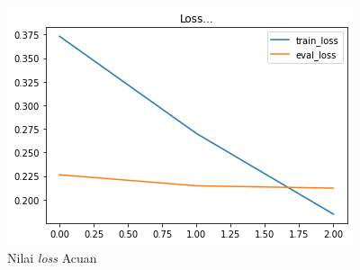 \begin{figure}[h]
    \begin{center}
        \includegraphics[width= 0.9\linewidth]{gambar/loss_concat_awal.png}
        \caption{Nilai \textit{loss} Acuan}
        \label{fig: loss_baseline}
    \end{center}
\end{figure}

